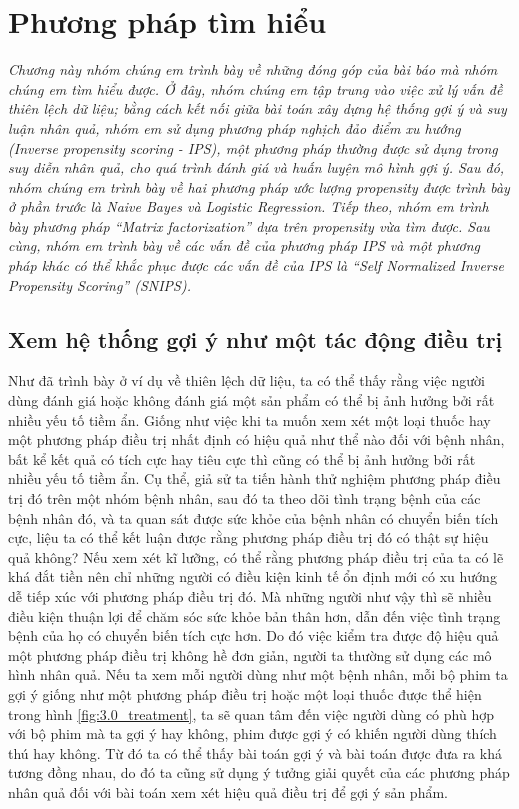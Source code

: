 \chapter{Phương pháp tìm hiểu}
\label{Chapter3}

\noindent\textit{Chương này nhóm chúng em trình bày về những đóng góp của bài báo mà nhóm chúng em tìm hiểu được. Ở đây, nhóm chúng em tập trung vào việc xử lý vấn đề thiên lệch dữ liệu; bằng cách kết nối giữa bài toán xây dựng hệ thống gợi ý và suy luận nhân quả, nhóm em sử dụng phương pháp nghịch đảo điểm xu hướng (Inverse propensity scoring - IPS), một phương pháp thường được sử dụng trong suy diễn nhân quả, cho quá trình đánh giá và huấn luyện mô hình gợi ý. Sau đó, nhóm chúng em trình bày về hai phương pháp ước lượng propensity được trình bày ở phần trước là Naive Bayes và Logistic Regression. Tiếp theo, nhóm em trình bày phương pháp ``Matrix factorization'' dựa trên propensity vừa tìm được. Sau cùng, nhóm em trình bày về các vấn đề của phương pháp IPS và một phương pháp khác có thể khắc phục được các vấn đề của IPS là ``Self Normalized Inverse Propensity Scoring'' (SNIPS).}

\section{Xem hệ thống gợi ý như một tác động điều trị}

Như đã trình bày ở ví dụ về thiên lệch dữ liệu, ta có thể thấy rằng việc người dùng đánh giá hoặc không đánh giá một sản phẩm có thể bị ảnh hưởng bởi rất nhiều yếu tố tiềm ẩn. Giống như việc khi ta muốn xem xét một loại thuốc hay một phương pháp điều trị nhất định có hiệu quả như thể nào đối với bệnh nhân, bất kể kết quả có tích cực hay tiêu cực thì cũng có thể bị ảnh hưởng bởi rất nhiều yếu tố tiềm ẩn. Cụ thể, giả sử ta tiến hành thử nghiệm phương pháp điều trị đó trên một nhóm bệnh nhân, sau đó ta theo dõi tình trạng bệnh của các bệnh nhân đó, và ta quan sát được sức khỏe của bệnh nhân có chuyển biến tích cực, liệu ta có thể kết luận được rằng phương pháp điều trị đó có thật sự hiệu quả không? Nếu xem xét kĩ lưỡng, có thể rằng phương pháp điều trị của ta có lẽ  khá đắt tiền nên chỉ những người có điều kiện kinh tế ổn định mới có xu hướng dễ tiếp xúc với phương pháp điều trị đó. Mà những người như vậy thì sẽ nhiều điều kiện thuận lợi để chăm sóc sức khỏe bản thân hơn, dẫn đến việc tình trạng bệnh của họ có chuyển biến tích cực hơn. Do đó việc kiểm tra được độ hiệu quả một phương pháp điều trị không hề đơn giản, người ta thường sử dụng các mô hình nhân quả. Nếu ta xem mỗi người dùng như một bệnh nhân, mỗi bộ phim ta gợi ý giống như một phương pháp điều trị hoặc một loại thuốc được thể hiện trong hình \ref{fig:3.0_treatment}, ta sẽ quan tâm đến việc người dùng có phù hợp với bộ phim mà ta gợi ý hay không, phim được gợi ý có khiến người dùng thích thú hay không. Từ đó ta có thể thấy bài toán gợi ý và bài toán được đưa ra khá tương đồng nhau, do đó ta cũng sử dụng ý tưởng giải quyết của các phương pháp nhân quả đối với bài toán xem xét hiệu quả điều trị để gợi ý sản phẩm.

